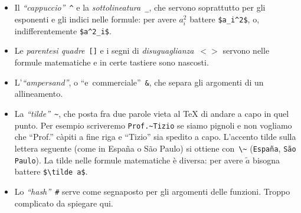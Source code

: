 \begin{itemize}
\item Il \emph{``cappuccio''}~\verb!^!
 e
la \emph{sottolineatura}~\verb!_!,
che servono soprattutto per gli esponenti e gli indici
nelle formule: per avere
$a_i^2$ battere \verb!$a_i^2$!, o, indifferentemente
\verb!$a^2_i$!.

\item Le \emph{parentesi
quadre}~\verb![]! e i segni di
\emph{disuguaglianza}~$<>$ servono nelle formule
matematiche e in certe tastiere sono nascosti.

\item L'\emph{``ampersand''}, o
``e~commerciale''~\verb!&!, che separa gli argomenti di un
allineamento.

\item La
\emph{``tilde''}~\verb!~!,
che posta fra due parole vieta al \TeX{} di andare a capo
in quel punto. Per esempio scriveremo
\verb!Prof.~Tizio! se siamo pignoli e non vogliamo che
``Prof.'' càpiti a fine riga e ``Tizio'' sia spedito a
capo. L'accento tilde sulla lettera seguente (come in
España o São Paulo) si ottiene con~\verb!\~!
(\verb!España!,
\verb!São Paulo!). La tilde nelle formule matematiche
è diversa: per avere $\tilde a$ bisogna battere
\verb!$\tilde a$!.

\item Lo
\emph{``hash''}~\verb!#!
serve come segnaposto per gli argomenti delle funzioni.
Troppo complicato da spiegare qui.

\end{itemize}